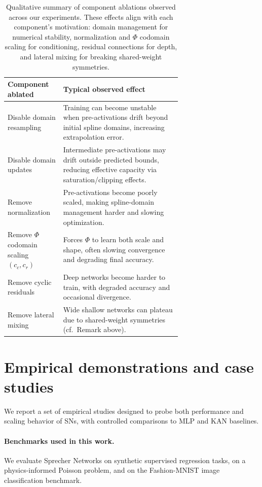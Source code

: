 \documentclass{article}
\theoremstyle{plain}
\theoremstyle{definition}
\theoremstyle{remark}
\begin{document}
\begin{table}[t]
\centering
\small
\begin{tabular}{l p{0.68\linewidth}}
\toprule
Component ablated & Typical observed effect \\
\midrule
Disable domain resampling & Training can become unstable when pre-activations drift beyond initial spline domains, increasing extrapolation error. \\
Disable domain updates & Intermediate pre-activations may drift outside predicted bounds, reducing effective capacity via saturation/clipping effects. \\
Remove normalization & Pre-activations become poorly scaled, making spline-domain management harder and slowing optimization. \\
Remove $\Phi$ codomain scaling $(c_c,c_r)$ & Forces $\Phi$ to learn both scale and shape, often slowing convergence and degrading final accuracy. \\
Remove cyclic residuals & Deep networks become harder to train, with degraded accuracy and occasional divergence. \\
Remove lateral mixing & Wide shallow networks can plateau due to shared-weight symmetries (cf.\ Remark above). \\
\bottomrule
\end{tabular}
\caption{Qualitative summary of component ablations observed across our experiments. These effects align with each component's motivation: domain management for numerical stability, normalization and $\Phi$ codomain scaling for conditioning, residual connections for depth, and lateral mixing for breaking shared-weight symmetries.}
\label{tab:component_ablations}
\end{table}

\section{Empirical demonstrations and case studies}\label{sec:experiments}
We report a set of empirical studies designed to probe both performance and scaling behavior of SNs, with controlled comparisons to MLP and KAN baselines.

\paragraph{Benchmarks used in this work.}

We evaluate Sprecher Networks on synthetic supervised regression tasks, on a physics-informed Poisson problem, and on the Fashion-MNIST image classification benchmark.
\end{document}
